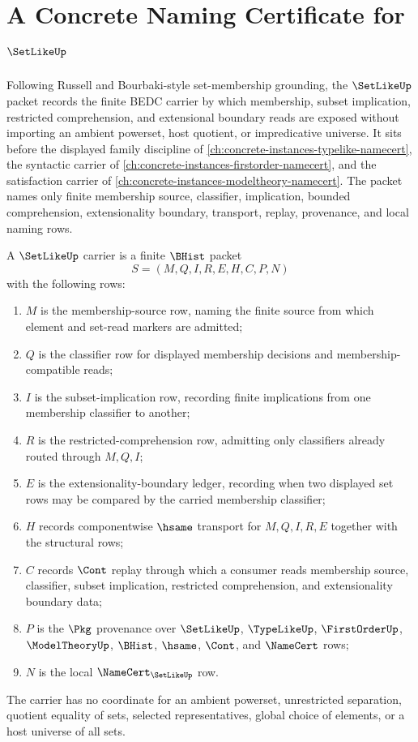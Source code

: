 \chapter{A Concrete Naming Certificate for $\SetLikeUp$}
\label{ch:concrete-instances-setlike-namecert}

Following Russell and Bourbaki-style set-membership grounding, the $\SetLikeUp$ packet records the finite BEDC carrier by which membership, subset implication, restricted comprehension, and extensional boundary reads are exposed without importing an ambient powerset, host quotient, or impredicative universe. It sits before the displayed family discipline of \autoref{ch:concrete-instances-typelike-namecert}, the syntactic carrier of \autoref{ch:concrete-instances-firstorder-namecert}, and the satisfaction carrier of \autoref{ch:concrete-instances-modeltheory-namecert}. The packet names only finite membership source, classifier, implication, bounded comprehension, extensionality boundary, transport, replay, provenance, and local naming rows.

\begin{definition}
\label{def:setlike-carrier}
A $\SetLikeUp$ carrier is a finite $\BHist$ packet
$$
S=(M,Q,I,R,E,H,C,P,N)
$$
with the following rows:
\begin{enumerate}
\item $M$ is the membership-source row, naming the finite source from which element and set-read markers are admitted;
\item $Q$ is the classifier row for displayed membership decisions and membership-compatible reads;
\item $I$ is the subset-implication row, recording finite implications from one membership classifier to another;
\item $R$ is the restricted-comprehension row, admitting only classifiers already routed through $M,Q,I$;
\item $E$ is the extensionality-boundary ledger, recording when two displayed set rows may be compared by the carried membership classifier;
\item $H$ records componentwise $\hsame$ transport for $M,Q,I,R,E$ together with the structural rows;
\item $C$ records $\Cont$ replay through which a consumer reads membership source, classifier, subset implication, restricted comprehension, and extensionality boundary data;
\item $P$ is the $\Pkg$ provenance over $\SetLikeUp$, $\TypeLikeUp$, $\FirstOrderUp$, $\ModelTheoryUp$, $\BHist$, $\hsame$, $\Cont$, and $\NameCert$ rows;
\item $N$ is the local $\NameCert_{\SetLikeUp}$ row.
\end{enumerate}
The carrier has no coordinate for an ambient powerset, unrestricted separation, quotient equality of sets, selected representatives, global choice of elements, or a host universe of all sets.
\end{definition}

